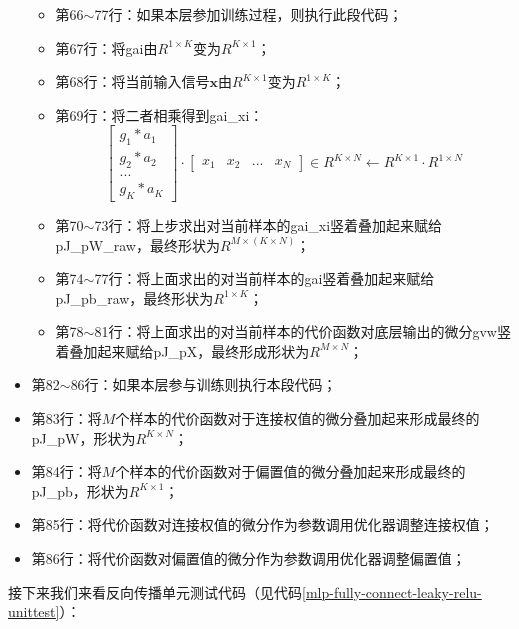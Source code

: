 \documentclass[UTF8]{article}
\begin{document}
\begin{itemize}
\begin{itemize}
\begin{equation}
	\end{equation}
	\item 第66$\sim$77行：如果本层参加训练过程，则执行此段代码；
	\item 第67行：将gai由$R^{1 \times K}$变为$R^{K \times 1}$；
	\item 第68行：将当前输入信号$\boldsymbol{x}$由$R^{K \times 1}$变为$R^{1 \times K}$；
	\item 第69行：将二者相乘得到gai\_xi：
	\begin{equation}
	\begin{bmatrix}
	g_{1}*a_{1} \\
	g_{2}*a_{2} \\
	... \\
	g_{K}*a_{K}
	\end{bmatrix} \cdot
	 \begin{bmatrix}
	x_{1} & x_{2} & ... & x_{N}
	\end{bmatrix} \in R^{K \times N} \leftarrow R^{K \times 1} \cdot R^{1 \times N}
	\label{ml-leaky-relu-backward-pass-gai-xi}
	\end{equation}
	\item 第70$\sim$73行：将上步求出对当前样本的gai\_xi竖着叠加起来赋给pJ\_pW\_raw，最终形状为$R^{M \times (K \times N)}$；
	\item 第74$\sim$77行：将上面求出的对当前样本的gai竖着叠加起来赋给pJ\_pb\_raw，最终形状为$R^{1 \times K}$；
	\item 第78$\sim$81行：将上面求出的对当前样本的代价函数对底层输出的微分gvw竖着叠加起来赋给pJ\_pX，最终形成形状为$R^{M \times N}$；
	\end{itemize}
\item 第82$\sim$86行：如果本层参与训练则执行本段代码；
\item 第83行：将$M$个样本的代价函数对于连接权值的微分叠加起来形成最终的pJ\_pW，形状为$R^{K \times N}$；
\item 第84行：将$M$个样本的代价函数对于偏置值的微分叠加起来形成最终的pJ\_pb，形状为$R^{K \times 1}$；
\item 第85行：将代价函数对连接权值的微分作为参数调用优化器调整连接权值；
\item 第86行：将代价函数对偏置值的微分作为参数调用优化器调整偏置值；
\end{itemize}
接下来我们来看反向传播单元测试代码（见代码\ref{mlp-fully-connect-leaky-relu-unittest}）：
\end{document}

